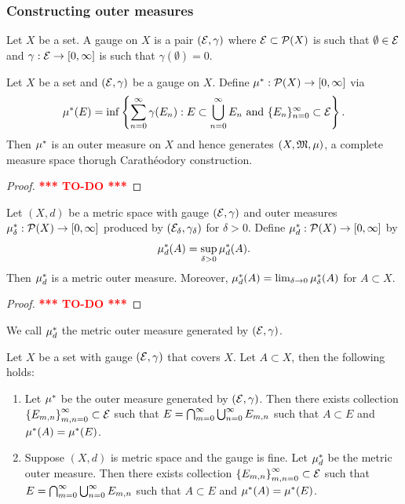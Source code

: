 \documentclass[a4paper]{article}
\newcommand{\TODO}{\textcolor{red}{\textbf{*** TO-DO ***}}}
\begin{document}
\subsubsection{Constructing outer measures}

\begin{defi}
  Let $X$ be a set. A gauge on $X$ is a pair $(\mathcal{E}, \gamma)$
  where $\mathcal{E} \subset \mathcal{P}(X)$ is such that $\emptyset 
  \in \mathcal{E}$ and $\gamma : \mathcal{E} \to [0, \infty]$ 
  is such that $\gamma(\emptyset) = 0$.
\end{defi}

\begin{thm}
  Let $X$ be a set and $(\mathcal{E}, \gamma)$ be a gauge on $X$.
  Define $\mu^*: \mathcal{P}(X) \to [0, \infty]$ via 
  \[
  \mu^*(E) = \inf \left\{ \sum_{n=0}^\infty \gamma(E_n): 
  E \subset \bigcup_{n=0}^\infty E_n \text{ and } 
  \{ E_n \}_{n=0}^\infty \subset \mathcal{E} \right\}.
  \]
  Then $\mu^*$ is an outer measure on $X$ and hence 
  generates $(X, \mathfrak{M}, \mu)$, a complete measure space 
  thorugh Carath\'eodory construction.
\end{thm}

\begin{proof}
  \TODO
\end{proof}

\begin{thm}
  Let $(X, d)$ be a metric space with gauge $(\mathcal{E}, \gamma)$
  and outer measures $\mu^*_\delta: \mathcal{P}(X) \to [0, \infty]$
  produced by $(\mathcal{E}_\delta, \gamma_\delta)$ for $\delta > 0$.
  Define $\mu^*_d : \mathcal{P}(X) \to [0, \infty]$ by 
  \[
  \mu^*_d(A) = \sup_{\delta > 0} \mu^*_d (A).
  \]
  Then $\mu^*_d$ is a metric outer measure. Moreover, 
  $\mu^*_d(A) = \lim_{\delta \to 0} \mu^*_\delta(A)$ 
  for $A \subset X$.
\end{thm}

\begin{proof}
  \TODO
\end{proof}

\begin{defi}
  We call $\mu^*_d$ the metric outer measure generated 
  by $(\mathcal{E}, \gamma)$.
\end{defi}

\begin{lemma}
  Let $X$ be a set with gauge $(\mathcal{E}, \gamma)$ that covers 
  $X$. Let $A \subset X$, then the following holds:
  \begin{enumerate}
    \item Let $\mu^*$ be the outer measure generated 
    by $(\mathcal{E}, \gamma)$. Then there exists collection 
    $\left\{ E_{m,n} \right\}_{m, n= 0}^\infty \subset \mathcal{E}$
    such that $E = \bigcap_{m=0}^\infty \bigcup_{n=0}^\infty E_{m, n}$ such that 
    $A \subset E$ and $\mu^*(A) = \mu^*(E)$. 

    \item Suppose $(X, d)$ is metric space and the gauge is 
    fine.
    Let $\mu^*_d$ be the metric outer measure. Then there exists collection 
    $\left\{ E_{m,n} \right\}_{m, n= 0}^\infty \subset \mathcal{E}$
    such that $E = \bigcap_{m=0}^\infty \bigcup_{n=0}^\infty E_{m, n}$ such that 
    $A \subset E$ and $\mu^*(A) = \mu^*(E)$. 
  \end{enumerate}
\end{lemma}
\end{document}
